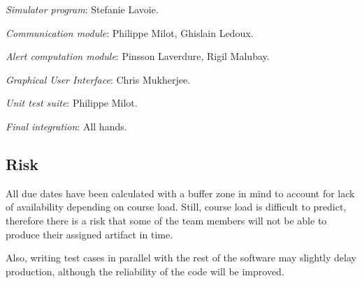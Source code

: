 \documentclass{article}
\begin{document}
\emph{Simulator program}: Stefanie Lavoie.

\emph{Communication module}: Philippe Milot, Ghislain Ledoux.

\emph{Alert computation module}: Pinsson Laverdure, Rigil Malubay.

\emph{Graphical User Interface}: Chris Mukherjee.

\emph{Unit test suite}: Philippe Milot.

\emph{Final integration}: All hands.

\subsection{Risk}

All due dates have been calculated with a buffer zone in mind to account for lack of availability depending on course load. Still, course load is difficult to predict, therefore there is a risk that some of the team members will not be able to produce their assigned artifact in time. 

Also, writing test cases in parallel with the rest of the software may slightly delay production, although the reliability of the code will be improved.
\end{document}
